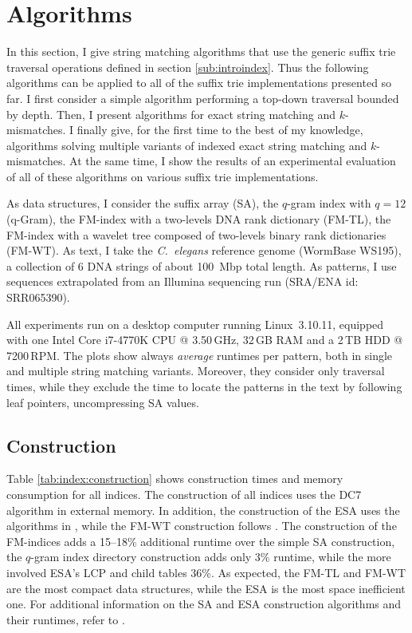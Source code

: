 \section{Algorithms}
\label{sec:index:algo}

In this section, I give string matching algorithms that use the generic suffix trie traversal operations defined in section \ref{sub:introindex}.
Thus the following algorithms can be applied to all of the suffix trie implementations presented so far.
I first consider a simple algorithm performing a top-down traversal bounded by depth.
Then, I present algorithms for exact string matching and $k$-mismatches.%
I finally give, for the first time to the best of my knowledge, algorithms solving multiple variants of indexed exact string matching and $k$-mismatches.
At the same time, I show the results of an experimental evaluation of all of these algorithms on various suffix trie implementations.

As data structures, I consider the suffix array (SA), the $q$-gram index with $q=12$ (q-Gram), the FM-index with a two-levels DNA rank dictionary (FM-TL), the FM-index with a wavelet tree composed of two-levels binary rank dictionaries (FM-WT).
As text, I take the \emph{C.~elegans} reference genome (WormBase WS195), \ie a collection of 6 DNA strings of about 100~Mbp total length.
As patterns, I use sequences extrapolated from an Illumina sequencing run (SRA/ENA id: SRR065390).

All experiments run on a desktop computer running Linux~3.10.11, equipped with one Intel\textsuperscript{\textregistered} Core i7-4770K CPU @ 3.50\,GHz, 32\,GB RAM and a 2\,TB HDD @ 7200\,RPM.
The plots show always \emph{average} runtimes per pattern, both in single and multiple string matching variants.
Moreover, they consider only traversal times, while they exclude the time to locate the patterns in the text by following leaf pointers, \eg uncompressing SA values.

\subsection{Construction}
\label{sec:index:algo:construction}

Table \ref{tab:index:construction} shows construction times and memory consumption for all indices.
The construction of all indices uses the DC7 algorithm \citep{Dementiev2008} in external memory.
In addition, the construction of the ESA uses the algorithms in \citep{Kasai2001,Abouelhoda2004}, while the FM-WT construction follows \citep{Grossi2003}.
The construction of the FM-indices adds a 15--18\% additional runtime over the simple SA construction, the $q$-gram index directory construction adds only 3\% runtime, while the more involved ESA's LCP and child tables 36\%.
As expected, the FM-TL and FM-WT are the most compact data structures, while the ESA is the most space inefficient one.
For additional information on the SA and ESA construction algorithms and their runtimes, refer to \citep{Weese2013}.

